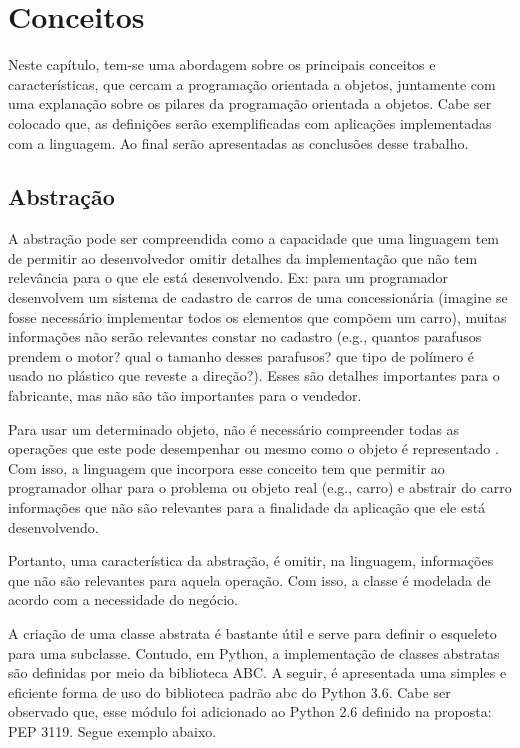 \documentclass[11pt,a4paper]{article}
\begin{document}
 

% 



\vspace{0.3in}

\section{Conceitos}
Neste capítulo, tem-se uma abordagem sobre os principais conceitos e características, que cercam a programação orientada a objetos, juntamente com uma explanação sobre os pilares da programação orientada a objetos. Cabe ser colocado que, as definições serão exemplificadas com aplicações implementadas com a linguagem. Ao final serão apresentadas as conclusões desse trabalho.

\subsection{Abstração}

A abstração pode ser compreendida como a capacidade que uma linguagem tem de permitir ao desenvolvedor omitir detalhes da implementação que não tem relevância para o que ele está desenvolvendo. Ex: para um programador desenvolvem um sistema de cadastro de carros de uma concessionária (imagine se fosse necessário implementar todos os elementos que compõem um carro), muitas informações não serão relevantes constar no cadastro (e.g., quantos parafusos prendem o motor? qual o tamanho desses parafusos? que tipo de polímero é usado no plástico que reveste a direção?). Esses são detalhes importantes para o fabricante, mas não são tão importantes para o vendedor.

Para usar um determinado objeto, não é necessário compreender todas as operações que este pode desempenhar ou mesmo como o objeto é representado \cite{snyder1986encapsulation}. Com isso, a linguagem que incorpora esse conceito tem que permitir ao programador olhar para o problema ou objeto real (e.g., carro) e abstrair do carro informações que não são relevantes para a finalidade da aplicação que ele está desenvolvendo. 

Portanto, uma característica da abstração, é omitir, na linguagem, informações que não são relevantes para aquela operação. Com isso, a classe é modelada de acordo com a necessidade do negócio.

A criação de uma classe abstrata é bastante útil e serve para definir o esqueleto para uma subclasse. Contudo, em Python, a implementação de classes abstratas são definidas por meio da biblioteca ABC. A seguir, é apresentada uma simples e eficiente forma de uso do biblioteca padrão abc do Python 3.6. Cabe ser observado que, esse módulo foi adicionado ao Python 2.6 definido na proposta: PEP 3119. Segue exemplo abaixo.
\end{document}
